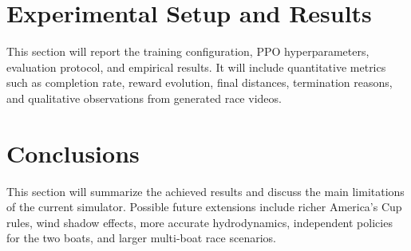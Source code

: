 \documentclass{article}
\begin{document}
\section{Experimental Setup and Results}

This section will report the training configuration, PPO hyperparameters, evaluation protocol,
and empirical results. It will include quantitative metrics such as completion rate, reward
evolution, final distances, termination reasons, and qualitative observations from generated
race videos.

\section{Conclusions}

This section will summarize the achieved results and discuss the main limitations of the
current simulator. Possible future extensions include richer America's Cup rules, wind shadow
effects, more accurate hydrodynamics, independent policies for the two boats, and larger
multi-boat race scenarios.
\end{document}

